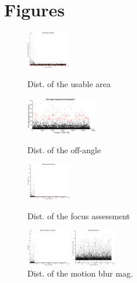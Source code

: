 \section{Figures}
\begin{figure}
	\begin{minipage}{0.48\linewidth}
		\centering
		\includegraphics[width=0.9\linewidth, height=1.6cm]{pics/dist_area_assess}
		\caption{Dist. of the usable area\cite{hugo}}
		\label{fig:area}
	\end{minipage}
	\hfill
	\begin{minipage}{0.48\linewidth}
		\centering
		\includegraphics[width=0.9\linewidth, height=1.6cm]{pics/dist_off_angle_deg_2}
		\caption{Dist. of the off-angle \cite{hugo}}
		\label{fig:ang}
	\end{minipage}
	\begin{minipage}{0.48\linewidth}
		\centering
		\includegraphics[width=0.9\linewidth, height=1.6cm]{pics/dist_focus_assess}
		\caption{Dist. of the focus assessment \cite{hugo}}
		\label{fig:focus} 
	\end{minipage}
	\hfill
	\begin{minipage}{0.48\linewidth}
		\centering
		\includegraphics[width=0.9\linewidth, height=1.6cm]{pics/dist_motion_blur_mag}
		\caption{Dist. of the motion blur mag. \cite{hugo}}
		\label{fig:motion}
	\end{minipage}
	\begin{minipage}{0.48\linewidth}
		\centering
		\includegraphics[width=0.9\linewidth, height=1.6cm]{pics/dist_pupil_dilation_ratio}

\end{minipage}
\end{figure}
